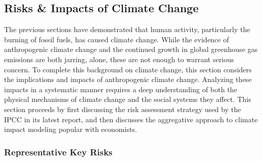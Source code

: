 \subsection{Risks \& Impacts of Climate Change}

The previous sections have demonstrated that human activity, particularly the burning of fossil fuels, has caused climate change. While the evidence of anthropogenic climate change and the continued growth in global greenhouse gas emissions are both jarring, alone, these are not enough to warrant serious concern. To complete this background on climate change, this section considers the implications and impacts of anthropogenic climate change. Analyzing these impacts in a systematic manner requires a deep understanding of both the physical mechanisms of climate change and the social systems they affect. This section proceeds by first discussing the risk assessment strategy used by the IPCC in its latest report, and then discusses the aggregative approach to climate impact modeling popular with economists.

\subsubsection{Representative Key Risks}


